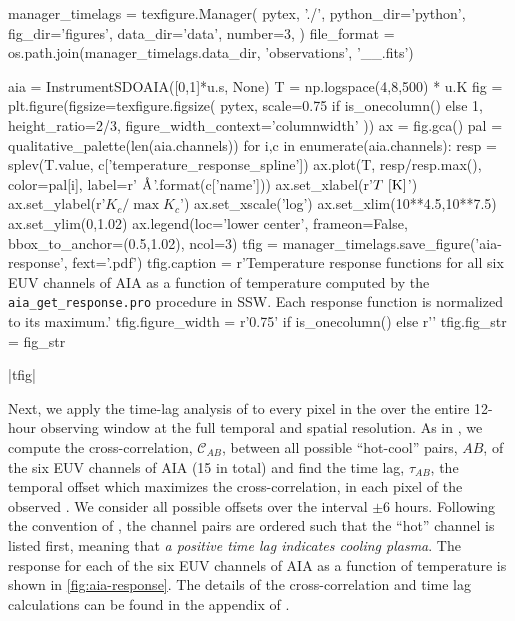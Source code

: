 \begin{pycode}
manager_timelags = texfigure.Manager(
    pytex, './',
    python_dir='python',
    fig_dir='figures',
    data_dir='data',
    number=3,
)
file_format = os.path.join(manager_timelags.data_dir, 'observations', '{}_{}_{}.fits')
\end{pycode}

\begin{pycode}
aia = InstrumentSDOAIA([0,1]*u.s, None)
T = np.logspace(4,8,500) * u.K
fig = plt.figure(figsize=texfigure.figsize(
    pytex,
    scale=0.75 if is_onecolumn() else 1,
    height_ratio=2/3,
    figure_width_context='columnwidth'
))
ax = fig.gca()
pal = qualitative_palette(len(aia.channels))
for i,c in enumerate(aia.channels):
    resp = splev(T.value, c['temperature_response_spline'])
    ax.plot(T, resp/resp.max(), color=pal[i], label=r'{} $\textup{{\AA}}$'.format(c['name']))
ax.set_xlabel(r'$T\,\,[\textup{K}]$')
ax.set_ylabel(r'$K_c/\max{K_c}$')
ax.set_xscale('log')
ax.set_xlim(10**4.5,10**7.5)
ax.set_ylim(0,1.02)
ax.legend(loc='lower center', frameon=False, bbox_to_anchor=(0.5,1.02), ncol=3)
tfig = manager_timelags.save_figure('aia-response', fext='.pdf')
tfig.caption = r'Temperature response functions for all six EUV channels of AIA as a function of temperature computed by the \texttt{aia\_get\_response.pro} procedure in SSW. Each response function is normalized to its maximum.'
tfig.figure_width = r'0.75\columnwidth' if is_onecolumn() else r'\columnwidth'
tfig.fig_str = fig_str
\end{pycode}
|tfig|

Next, we apply the time-lag analysis of \citet{viall_evidence_2012} to every pixel in the \AR{} over the entire 12-hour observing window at the full temporal and spatial resolution. As in , we compute the cross-correlation, $\mathcal{C}_{AB}$, between all possible ``hot-cool'' pairs, $AB$, of the six EUV channels of AIA (15 in total) and find the time lag, $\tau_{AB}$, the temporal offset which maximizes the cross-correlation, in each pixel of the observed \AR{}. We consider all possible offsets over the interval $\pm6$ hours. Following the convention of \citet{viall_evidence_2012}, the channel pairs are ordered such that the ``hot'' channel is listed first, meaning that \textit{a positive time lag indicates cooling plasma}. The response for each of the six EUV channels of AIA as a function of temperature is shown in \autoref{fig:aia-response}. The details of the cross-correlation and time lag calculations can be found in the appendix of .

